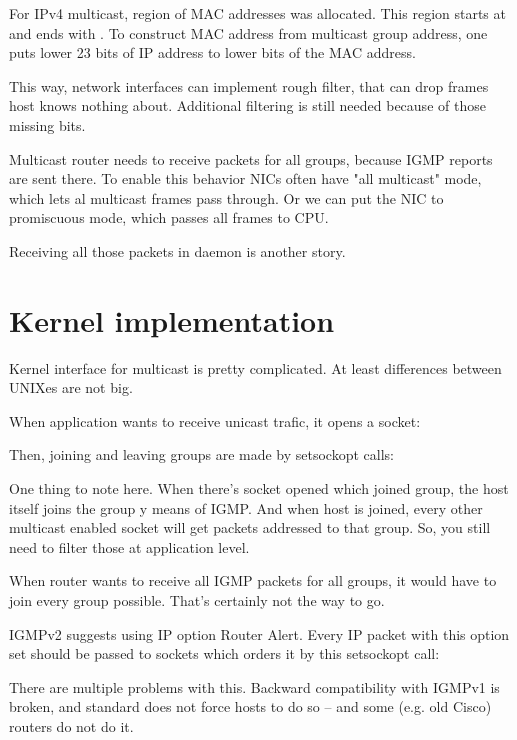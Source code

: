 For IPv4 multicast, region of MAC addresses was allocated. This region starts
at  and ends with . To construct
MAC address from multicast group address, one puts lower 23 bits of IP address
to lower bits of the MAC address.

This way, network interfaces can implement rough filter, that can drop frames
host knows nothing about. Additional filtering is still needed because of those
missing bits.

Multicast router needs to receive packets for all groups, because IGMP reports
are sent there. To enable this behavior NICs often have "all multicast" mode,
which lets al multicast frames pass through. Or we can put the NIC to
promiscuous mode, which passes all frames to CPU.

Receiving all those packets in daemon is another story.

\section{Kernel implementation}

Kernel interface for multicast is pretty complicated. At least differences
between UNIXes are not big.

When application wants to receive unicast trafic, it opens a socket:


\noindent Then, joining and leaving groups are made by setsockopt calls:


One thing to note here. When there's socket opened which joined group, the host
itself joins the group y means of IGMP. And when host is joined, every other
multicast enabled socket will get packets addressed to that group. So, you
still need to filter those at application level.

\noindent When router wants to receive all IGMP packets for all groups, it
would have to join every group possible. That's certainly not the way to go.

IGMPv2 suggests using IP option Router Alert. Every IP packet with this option
set should be passed to sockets which orders it by this setsockopt call:


\noindent There are multiple problems with this. Backward compatibility with IGMPv1 is
broken, and standard does not force hosts to do so -- and some (e.g. old Cisco)
routers do not do it.

